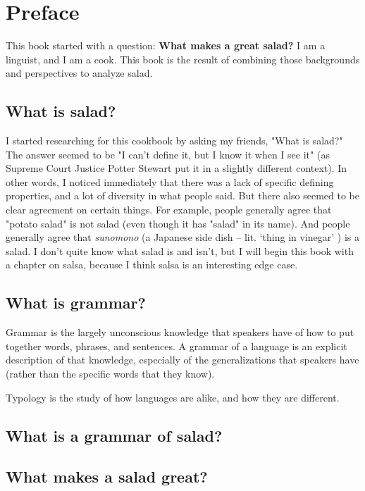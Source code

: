 \chapter{Preface}

This book started with a question: \textbf{What makes a great salad?} I am a linguist, and I am a cook. This book is the result of combining those backgrounds and perspectives to analyze salad.

\section{What is salad?}

I started researching for this cookbook by asking my friends, "What is salad?" The answer seemed to be "I can't define it, but I know it when I see it" (as Supreme Court Justice Potter Stewart put it in a slightly different context). In other words, I noticed immediately that there was a lack of specific defining properties, and a lot of diversity in what people said. But there also seemed to be clear agreement on certain things. For example, people generally agree that "potato salad" is not salad (even though it has "salad" in its name). And people generally agree that \textit{sunomono} (a Japanese side dish -- lit. `thing in vinegar' ) is a salad. I don't quite know what salad is and isn't, but I will begin this book with a chapter on salsa, because I think salsa is an interesting edge case.

\section{What is grammar?}

Grammar is the largely unconscious knowledge that speakers have of how to put together words, phrases, and sentences. A grammar of a language is an explicit description of that knowledge, especially of the generalizations that speakers have (rather than the specific words that they know).

Typology is the study of how languages are alike, and how they are different. 

\section{What is a grammar of salad?}

\section{What makes a salad great?}

